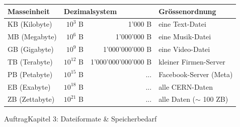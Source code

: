 \begin{frame}
\begin{table}[H]
	\footnotesize
	\centering
	\begin{tabular}{@{}l|rr|l@{}}
		\midrule
		\textbf{Masseinheit} & \multicolumn{2}{l|}{\textbf{Dezimalsystem}} & Grössenordnung                                   \\ \midrule
		KB (Kilobyte)        & $10^3$ B                               & 1'000 B             & eine Text-Datei            \\
		MB (Megabyte)        & $10^6$ B                                    & 1'000'000 B         & eine Musik-Datei           \\
		GB (Gigabyte)        & $10^9$ B                                    & 1'000'000'000 B     & eine Video-Datei           \\
		TB (Terabyte)        & $10^{12}$ B                                 & 1'000'000'000'000 B & kleiner Firmen-Server      \\
		PB (Petabyte)        & $10^{15}$ B                                 & ...                 & Facebook-Server (Meta)     \\
		EB (Exabyte)         & $10^{18}$ B                                 & ...                 & alle CERN-Daten            \\
		ZB (Zettabyte)       & $10^{21}$ B                                 & ...                 & alle Daten ($\sim$ 100 ZB) \\ \midrule
	\end{tabular}
\end{table}
\end{frame}


\begin{frame}{Auftrag}{Kapitel 3: Dateiformate \& Speicherbedarf}
\vspace{3mm}
\vspace{3mm}
\end{frame}

